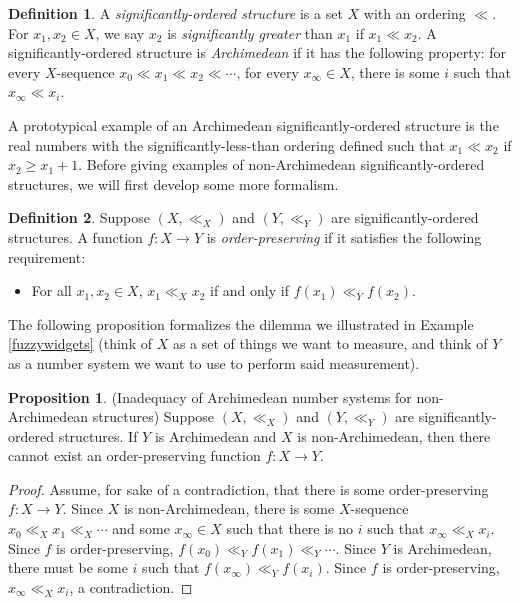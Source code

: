 \documentclass[reqno]{article}
\theoremstyle{definition}
\newtheorem{proposition}[theorem]{Proposition}
\newtheorem{definition}{Definition}
\begin{document}
\begin{definition}
    A \emph{significantly-ordered structure} is a set $X$ with
    an ordering $\ll$.
    For $x_1,x_2\in X$, we say $x_2$ is \emph{significantly greater}
    than $x_1$ if $x_1\ll x_2$.
    A significantly-ordered structure is \emph{Archimedean} if it
    has the following property: for every $X$-sequence
    $x_0\ll x_1\ll x_2 \ll \cdots$,
    for every $x_\infty\in X$, there is some $i$ such that $x_\infty\ll x_i$.
\end{definition}

A prototypical example of an Archimedean significantly-ordered structure is the real
numbers with the significantly-less-than ordering defined such that
$x_1\ll x_2$ if $x_2\geq x_1+1$.
Before giving examples of non-Archimedean significantly-ordered structures,
we will first develop some more formalism.

\begin{definition}
    Suppose $(X,\ll_X)$ and $(Y,\ll_Y)$
    are significantly-ordered structures.
    A function $f:X\to Y$ is \emph{order-preserving} if it satisfies the following
    requirement:
    \begin{itemize}
        \item
            For all $x_1,x_2\in X$, $x_1\ll_X x_2$ if and only if
            $f(x_1)\ll_Yf(x_2)$.
    \end{itemize}
\end{definition}

The following proposition formalizes the dilemma we illustrated in
Example \ref{fuzzywidgets} (think of $X$ as a set of things we
want to measure, and think of $Y$ as a number system we want to use to
perform said measurement).

\begin{proposition}
\label{maindilemma}
(Inadequacy of Archimedean number systems for non-Archimedean structures)
    Suppose $(X,\ll_X)$ and $(Y,\ll_Y)$
    are significantly-ordered structures.
    If $Y$ is Archimedean and $X$ is non-Archimedean, then there cannot exist
    an order-preserving function $f:X\to Y$.
\end{proposition}

\begin{proof}
    Assume, for sake of a contradiction, that there is some order-preserving
    $f:X\to Y$.
    Since $X$ is non-Archimedean, there is some $X$-sequence
    $x_0\ll_X x_1\ll_X \cdots$ and some
    $x_\infty\in X$ such that there is no $i$ such that $x_\infty\ll_X x_i$.
    Since $f$ is order-preserving,
    $f(x_0)\ll_Y f(x_1) \ll_Y \cdots$.
    Since $Y$ is Archimedean, there must be some $i$ such that
    $f(x_\infty)\ll_Y f(x_i)$.
    Since $f$ is order-preserving, $x_\infty\ll_X x_i$, a contradiction.
\end{proof}
\end{document}
